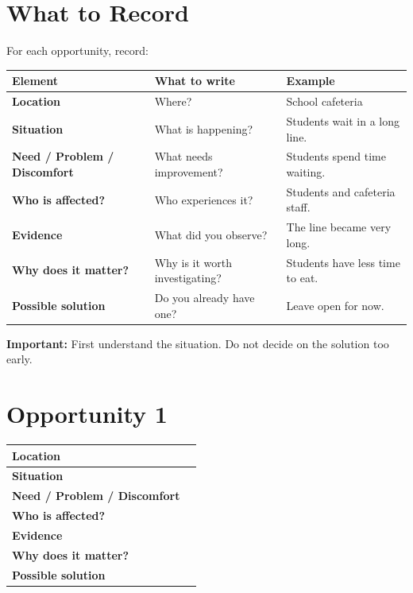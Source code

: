 \documentclass[12pt,a4paper]{article}
\begin{document}
	\newpage
	
	\section*{What to Record}
	
	For each opportunity, record:
	
	\begin{center}
		\small
		\begin{tabular}{|L{0.20\textwidth}|L{0.26\textwidth}|L{0.38\textwidth}|}
			\hline
			\textbf{Element} & \textbf{What to write} & \textbf{Example} \\
			\hline
			\textbf{Location} & Where? & School cafeteria \\
			\hline
			\textbf{Situation} & What is happening? & Students wait in a long line. \\
			\hline
			\textbf{Need / Problem / Discomfort} & What needs improvement? & Students spend time waiting. \\
			\hline
			\textbf{Who is affected?} & Who experiences it? & Students and cafeteria staff. \\
			\hline
			\textbf{Evidence} & What did you observe? & The line became very long. \\
			\hline
			\textbf{Why does it matter?} & Why is it worth investigating? & Students have less time to eat. \\
			\hline
			\textbf{Possible solution} & Do you already have one? & Leave open for now. \\
			\hline
		\end{tabular}
	\end{center}
	
	\textbf{Important:} First understand the situation. Do not decide on the solution too early.
	
	\section*{Opportunity 1}
	
	\begin{center}
		\small
		\begin{tabular}{|L{0.22\textwidth}|L{0.61\textwidth}|}
			\hline
			\textbf{Location} & \rule{0pt}{0.5cm} \\
			\hline
			\textbf{Situation} & \rule{0pt}{0.5cm} \\
			\hline
			\textbf{Need / Problem / Discomfort} & \rule{0pt}{0.5cm} \\
			\hline
			\textbf{Who is affected?} & \rule{0pt}{0.45cm} \\
			\hline
			\textbf{Evidence} & \rule{0pt}{0.6cm} \\
			\hline
			\textbf{Why does it matter?} & \rule{0pt}{0.5cm} \\
			\hline
			\textbf{Possible solution} & \rule{0pt}{0.45cm} \\
			\hline
		\end{tabular}
	\end{center}
	
\end{document}
